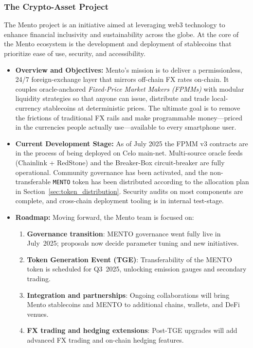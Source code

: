 \documentclass[a4paper]{article}
\theoremstyle{definition}
\begin{document}
\begin{appendices}
\subsubsection{The Crypto-Asset Project}
The Mento project is an initiative aimed at leveraging web3 technology to enhance financial inclusivity and sustainability across the globe. At the core of the Mento ecosystem is the development and deployment of stablecoins that prioritize ease of use, security, and accessibility. 

\begin{itemize}
    \item \textbf{Overview and Objectives:} Mento's mission is to deliver a permissionless, 24/7 foreign-exchange layer that mirrors off-chain FX rates on-chain.  It couples oracle-anchored \emph{Fixed-Price Market Makers (FPMMs)} with modular liquidity strategies so that anyone can issue, distribute and trade local-currency stablecoins at deterministic prices.  The ultimate goal is to remove the frictions of traditional FX rails and make programmable money—priced in the currencies people actually use—available to every smartphone user.
    
    \item \textbf{Current Development Stage:} As of July 2025 the FPMM v3 contracts are in the process of being deployed on Celo main-net.  Multi-source oracle feeds (Chainlink + RedStone) and the Breaker-Box circuit-breaker are fully operational.  Community governance has been activated, and the non-transferable \texttt{MENTO} token has been distributed according to the allocation plan in Section~\ref{sec:token_distribution}.  Security audits on most components are complete, and cross-chain deployment tooling is in internal test-stage.
    
    \item \textbf{Roadmap:} Moving forward, the Mento team is focused on:
    \begin{enumerate}
        \item \textbf{Governance transition}: MENTO governance went fully live in July~2025; proposals now decide parameter tuning and new initiatives.
        \item \textbf{Token Generation Event (TGE)}: Transferability of the MENTO token is scheduled for Q3~2025, unlocking emission gauges and secondary trading.
        \item \textbf{Integration and partnerships}: Ongoing collaborations will bring Mento stablecoins and MENTO to additional chains, wallets, and DeFi venues.
        \item \textbf{FX trading and hedging extensions}: Post-TGE upgrades will add advanced FX trading and on-chain hedging features.
    \end{enumerate}
\end{itemize}


\end{appendices}
\end{document}
